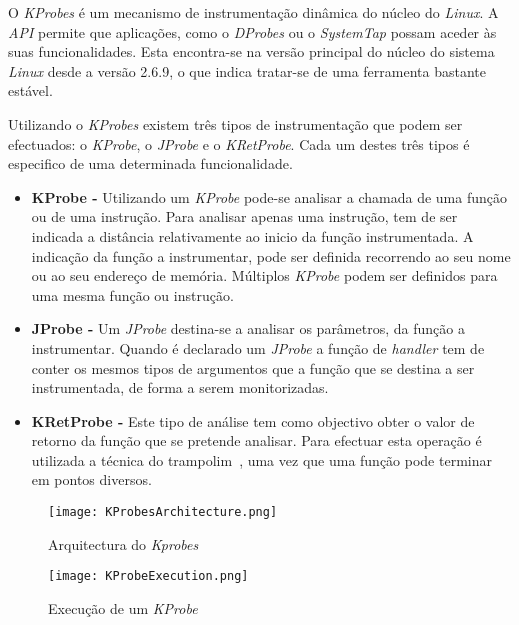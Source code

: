 O \textit{KProbes} é um mecanismo de instrumentação dinâmica do núcleo do \textit{Linux}.
A \textit{API} permite que aplicações, como o \textit{DProbes} ou o \textit{SystemTap} possam aceder às suas funcionalidades.
Esta encontra-se na versão principal do núcleo do sistema \textit{Linux} desde a versão 2.6.9, o que indica tratar-se de uma ferramenta bastante estável\cite{kernel_debug_printk_on_fly,KProbesSite}.

Utilizando o \textit{KProbes} existem três tipos de instrumentação que podem ser efectuados: o \textit{KProbe}, o \textit{JProbe} e o \textit{KRetProbe}.
Cada um destes três tipos é especifico de uma determinada funcionalidade.

\begin{itemize}
 \item \textbf{KProbe - } Utilizando um \textit{KProbe} pode-se analisar a chamada de uma função ou de uma instrução.
Para analisar apenas uma instrução, tem de ser indicada a distância relativamente ao inicio da função instrumentada.
A indicação da função a instrumentar, pode ser definida recorrendo ao seu nome ou ao seu endereço de memória.
Múltiplos \textit{KProbe} podem ser definidos para uma mesma função ou instrução.

\item \textbf{JProbe - } Um \textit{JProbe} destina-se a analisar os parâmetros, da função a instrumentar.
Quando é declarado um \textit{JProbe} a função de \textit{handler} tem de conter os mesmos tipos de argumentos que a função que se destina a ser instrumentada, de forma a serem monitorizadas.
 
 \item \textbf{KRetProbe - } Este tipo de análise tem como objectivo obter o valor de retorno da função que se pretende analisar.
Para efectuar esta operação é utilizada a técnica do trampolim~\cite{Hollingsworth94dynamicprogram}, uma vez que uma função pode terminar em pontos diversos.

\end{itemize}

\begin{figure}[!htb]
       \centering
       \texttt{[image: KProbesArchitecture.png]}
       \caption{Arquitectura do \textit{Kprobes} }
	\label{fig:kprobes_arch}
\end{figure}

\begin{figure}[!htb]
       \centering
       \texttt{[image: KProbeExecution.png]}
       \caption{Execução de um \textit{KProbe} }
	\label{fig:kprobe_execution}
\end{figure}

